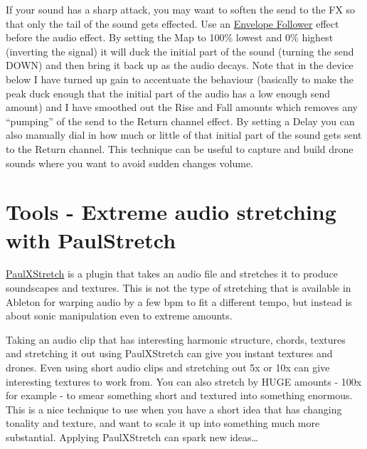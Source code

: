 \documentclass[
  12pt,
  letterpaper,
  oneside,
  open=any]{scrbook}
\makeatletter
\newcommand*\pandocbounded[1]{%
  \sbox\pandoc@box{#1}%
  \Gscale@div\@tempa{\textheight}{\dimexpr\ht\pandoc@box+\dp\pandoc@box\relax}%
  \Gscale@div\@tempb{\linewidth}{\wd\pandoc@box}%
  \ifdim\@tempb\p@<\@tempa\p@\let\@tempa\@tempb\fi%
  \ifdim\@tempa\p@<\p@\scalebox{\@tempa}{\usebox\pandoc@box}%
  \else\usebox{\pandoc@box}%
  \fi%
}
\makeatother
\begin{document}
If your sound has a sharp attack, you may want to soften the send to the
FX so that only the tail of the sound gets effected. Use an
\href{https://www.ableton.com/en/live-manual/11/max-for-live-devices/\#envelope-follower}{Envelope
Follower} effect before the audio effect. By setting the Map to 100\%
lowest and 0\% highest (inverting the signal) it will duck the initial
part of the sound (turning the send DOWN) and then bring it back up as
the audio decays. Note that in the device below I have turned up gain to
accentuate the behaviour (basically to make the peak duck enough that
the initial part of the audio has a low enough send amount) and I have
smoothed out the Rise and Fall amounts which removes any ``pumping'' of
the send to the Return channel effect. By setting a Delay you can also
manually dial in how much or little of that initial part of the sound
gets sent to the Return channel. This technique can be useful to capture
and build drone sounds where you want to avoid sudden changes volume.

\pandocbounded{\texttt{[image: images/Envelope\_Follower\_Send.png]}}


\chapter{Tools - Extreme audio stretching with
PaulStretch}\label{016-Tools-PaulStretch}

\href{https://sonosaurus.com/paulxstretch/}{PaulXStretch} is a plugin
that takes an audio file and stretches it to produce soundscapes and
textures. This is not the type of stretching that is available in
Ableton for warping audio by a few bpm to fit a different tempo, but
instead is about sonic manipulation even to extreme amounts.

\begin{tcolorbox}[enhanced jigsaw, toprule=.15mm, leftrule=.75mm, coltitle=black, bottomtitle=1mm, colbacktitle=quarto-callout-tip-color!10!white, bottomrule=.15mm, opacityback=0, colback=white, arc=.35mm, colframe=quarto-callout-tip-color-frame, opacitybacktitle=0.6, toptitle=1mm, titlerule=0mm, rightrule=.15mm, title=\textcolor{quarto-callout-tip-color}{\faLightbulb}\hspace{0.5em}{Key idea}, left=2mm, breakable]

Taking an audio clip that has interesting harmonic structure, chords,
textures and stretching it out using PaulXStretch can give you instant
textures and drones. Even using short audio clips and stretching out 5x
or 10x can give interesting textures to work from. You can also stretch
by HUGE amounts - 100x for example - to smear something short and
textured into something enormous. This is a nice technique to use when
you have a short idea that has changing tonality and texture, and want
to scale it up into something much more substantial. Applying
PaulXStretch can spark new ideas\ldots{}

\end{tcolorbox}
\end{document}
